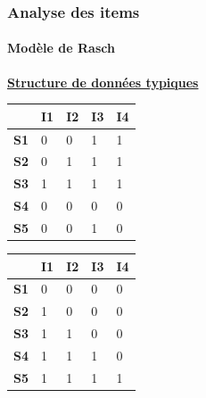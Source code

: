 \documentclass[aspectratio=169,professionalfonts, 12pt]{beamer}
\begin{document}
\begin{frame}
  \frametitle{Analyse des items}
  \framesubtitle{Modèle de Rasch}
  \justifying 
  \begin{minipage}{\textwidth}
    \centering \textbf{\underline{Structure de données typiques}}
    \begin{table}[H]
      \centering
      \begin{tabular}{|m{0.5cm}|m{0.5cm}|m{0.5cm}|m{0.5cm}|m{0.5cm}|} \hline
       & \textbf{I1} & \textbf{I2} & \textbf{I3} & \textbf{I4} \\ \hline
       \textbf{S1} & 0 & 0 & 1 & 1 \\ \hline
       \textbf{S2} & 0 & 1 & 1 & 1 \\ \hline
       \textbf{S3} & 1 & 1 & 1 & 1 \\ \hline
       \textbf{S4} & 0 & 0 & 0 & 0 \\ \hline
       \textbf{S5} & 0 & 0 & 1 & 0 \\ \hline
      \end{tabular}
      \hfill
      \begin{tabular}{|m{0.5cm}|m{0.5cm}|m{0.5cm}|m{0.5cm}|m{0.5cm}|} \hline
        & \textbf{I1} & \textbf{I2} & \textbf{I3} & \textbf{I4} \\ \hline
        \textbf{S1} & 0 & 0 & 0 & 0 \\ \hline
        \textbf{S2} & 1 & 0 & 0 & 0 \\ \hline
        \textbf{S3} & 1 & 1 & 0 & 0 \\ \hline
        \textbf{S4} & 1 & 1 & 1 & 0 \\ \hline
        \textbf{S5} & 1 & 1 & 1 & 1 \\ \hline
       \end{tabular}
    \end{table}
  \end{minipage} 
\end{frame}
\end{document}
